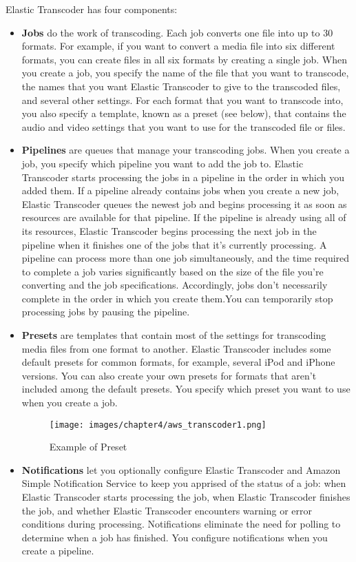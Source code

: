Elastic Transcoder has four components:
\begin{itemize}

\item \textbf{Jobs} do the work of transcoding. Each job converts one file into up to 30 formats. For example, if you want to convert a media file into six different formats, you can create files in all six formats by creating a single job. When you create a job, you specify the name of the file that you want to transcode, the names that you want Elastic Transcoder to give to the transcoded files, and several other settings. For each format that you want to transcode into, you also specify a template, known as a preset (see below), that contains the audio and video settings that you want to use for the transcoded file or files.

\item \textbf{Pipelines} are queues that manage your transcoding jobs. When you create a job, you specify which pipeline you want to add the job to. Elastic Transcoder starts processing the jobs in a pipeline in the order in which you added them. If a pipeline already contains jobs when you create a new job, Elastic Transcoder queues the newest job and begins processing it as soon as resources are available for that pipeline. If the pipeline is already using all of its resources, Elastic Transcoder begins processing the next job in the pipeline when it finishes one of the jobs that it's currently processing. A pipeline can process more than one job simultaneously, and the time required to complete a job varies significantly based on the size of the file you're converting and the job specifications. Accordingly, jobs don't necessarily complete in the order in which you create them.You can temporarily stop processing jobs by pausing the pipeline.

\item \textbf{Presets} are templates that contain most of the settings for transcoding media files from one format to another. Elastic Transcoder includes some default presets for common formats, for example, several iPod and iPhone versions. You can also create your own presets for formats that aren't included among the default presets. You specify which preset you want to use when you create a job.


\begin{figure}[htb] %
 \centering
 \texttt{[image: images/chapter4/aws\_transcoder1.png]}\hfill
 \caption[Example of Preset]{Example of Preset}
 \label{fig:fourV}
\end{figure}


\item \textbf{Notifications} let you optionally configure Elastic Transcoder and Amazon Simple Notification Service to keep you apprised of the status of a job: when Elastic Transcoder starts processing the job, when Elastic Transcoder finishes the job, and whether Elastic Transcoder encounters warning or error conditions during processing. Notifications eliminate the need for polling to determine when a job has finished. You configure notifications when you create a pipeline.
\end{itemize}

